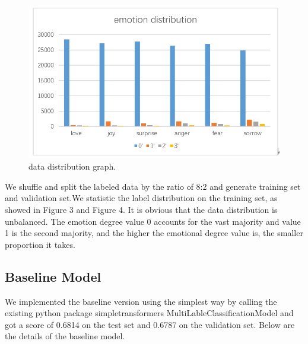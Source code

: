 \documentclass[12pt,twocolumn,letterpaper]{article}
\begin{document}
\begin{figure}
\begin{center}
\includegraphics[scale=0.3]{emotion distribution.png}
\end{center}
   \caption{data distribution graph.}
\label{fig:short}
\end{figure}
We shuffle and split the labeled data  by the ratio of 8:2 and generate training set and validation set.We statistic the label distribution on the training set, as showed in Figure 3 and Figure 4. It is obvious that the data distribution is unbalanced. The emotion degree value 0 accounts for the vast majority and value 1 is the second majority, and the higher the emotional degree value is, the smaller proportion it takes. 



\subsection{Baseline Model}

We implemented the baseline version using the simplest way by calling the existing python package simpletransformers MultiLableClassificationModel and got a score of 0.6814 on the test set and 0.6787 on the validation set. Below are the details of the baseline model.
\end{document}
